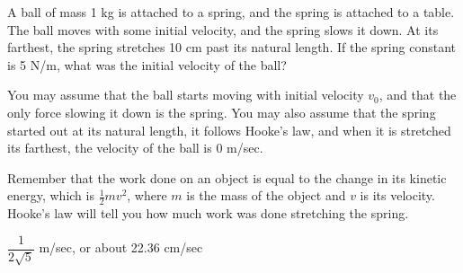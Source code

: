 \begin{question}\label{prob_s2.1:Work_KE}
A ball of mass 1 kg is attached to a spring, and the spring is attached to a table. The ball moves with some initial velocity, and the spring slows it down. At its farthest, the spring stretches 10 cm past its natural length. If the spring constant is 5 N/m, what was the initial velocity of the ball?

\begin{center}
\end{center}

You may assume that the ball starts moving with initial velocity $v_0$, and that the only force slowing it down is the spring. You may also assume that the spring started out at its natural length, it follows Hooke's law, and when it is stretched its farthest, the velocity of the ball is 0 m/sec.
\end{question}
\begin{hint}
Remember that the work done on an object is equal to the change in its kinetic energy, which is $\frac{1}{2}mv^2$, where $m$ is the mass of the object and $v$ is its velocity. Hooke's law will tell you how much work was done stretching the spring.
\end{hint}
\begin{answer}
$\dfrac{1}{2\sqrt{5}}$ m/sec, or about 22.36 cm/sec
\end{answer}
